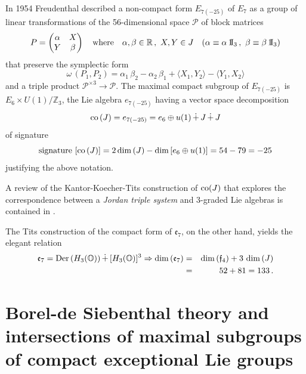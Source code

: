 \documentclass{article}
\newcommand{\be}{\begin{equation}}
\newcommand{\ee}{\end{equation}}
\def\un{{\rm 1\mkern-4mu I}}
\begin{document}
\smallskip

In 1954 Freudenthal described a non-compact form $E_{7 (-25)}$ of $E_7$ as a group of linear transformations of the 56-dimensional space ${\mathcal P}$ of block matrices
\be
\label{eq325}
P = \begin{pmatrix}
\alpha &X \\
Y &\beta \end{pmatrix} \quad \mbox{where} \quad \alpha , \beta \in {\mathbb R} \, , \ X,Y \in J \quad (\alpha \equiv \alpha \, \un_3 \, , \ \beta \equiv \beta \, \un_3)
\ee
that preserve the symplectic form
\be
\label{eq325bis}
\omega \, (P_1 , P_2) = \alpha_1 \, \beta_2 - \alpha_2 \, \beta_1 + \langle X_1 , Y_2 \rangle - \langle Y_1 , X_2 \rangle
\ee
and a triple product ${\mathcal P}^{\times 3} \to {\mathcal P}$. The maximal compact subgroup of $E_{7(-25)}$ is $E_6 \times U(1) / {\mathbb Z}_3$, the Lie algebra $e_{7(-25)}$ having a vector space decomposition
\be
\label{eq325ter}
{\rm co} \, (J) = e_{7(-25)} = e_6 \oplus u(1) \, \dot + \, J \, \dot + \, J
\ee
of signature
\be
\label{eq326}
\mbox{signature} \ [{\rm co} \, (J)] = 2 \dim \, (J) - \dim \, [e_6 \oplus u(1)] = 54-79 = -25 
\ee
justifying the above notation.

\smallskip

A review of the Kantor-Koecher-Tits construction of ${\rm co} (J)$ that explores the correspondence between a {\it Jordan triple system} and 3-graded Lie algebras is contained in \cite{P}.

\smallskip

The Tits construction of the compact form of ${\mathfrak e}_7$, on the other hand, yields the elegant relation
\begin{eqnarray}
\label{eq327}
{\mathfrak e}_7 = {\rm Der} \, (H_3 ({\mathbb O})) \, \dot + \, [H_3 ({\mathbb O})]^3 \Rightarrow \dim \, ({\mathfrak e}_7) &= &\dim \, ({\mathfrak f}_4) + 3 \, \dim \, (J) \nonumber \\
&= &52+81=133 \, .
\end{eqnarray}

\newpage

\section{Borel-de Siebenthal theory and intersections of maximal subgroups of compact exceptional Lie groups}\label{sec4}
\setcounter{equation}{0}
\end{document}
